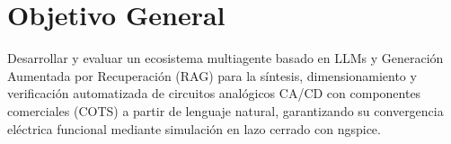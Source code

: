 \section*{Objetivo General}
Desarrollar y evaluar un ecosistema multiagente basado en LLMs y Generación Aumentada por Recuperación (RAG) para la síntesis, dimensionamiento y verificación automatizada de circuitos analógicos CA/CD con componentes comerciales (COTS) a partir de lenguaje natural, garantizando su convergencia eléctrica funcional mediante simulación en lazo cerrado con ngspice.